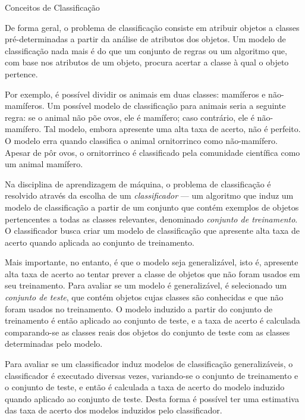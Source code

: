 \begin{section}{Conceitos de Classificação} \label{cap:clas1}
	
	De forma geral, o problema de classificação consiste em atribuir objetos a classes pré-determinadas a partir da análise de atributos dos objetos. Um modelo de classificação nada mais é do que um conjunto de regras ou um algoritmo que, com base nos atributos de um objeto, procura acertar a classe à qual o objeto pertence. 

	Por exemplo, é possível dividir os animais em duas classes: mamíferos e não-mamíferos. Um possível modelo de classificação para animais seria a seguinte regra: se o animal não põe ovos, ele é mamífero; caso contrário, ele é não-mamífero. Tal modelo, embora apresente uma alta taxa de acerto, não é perfeito. O modelo erra quando classifica o animal ornitorrinco como não-mamífero. Apesar de pôr ovos, o ornitorrinco é classificado pela comunidade científica como um animal mamífero.
	
	
	
	Na disciplina de aprendizagem de máquina, o problema de classificação é resolvido através da escolha de um \emph{classificador} --- um algoritmo que induz um modelo de classificação a partir de um conjunto que contém exemplos de objetos pertencentes a todas as classes relevantes, denominado \emph{conjunto de treinamento}. O classificador busca criar um modelo de classificação que apresente alta taxa de acerto quando aplicada ao conjunto de treinamento. 
	
	Mais importante, no entanto, é que o modelo seja generalizável, isto é, apresente alta taxa de acerto ao tentar prever a classe de objetos que não foram usados em seu treinamento. Para avaliar se um modelo é generalizável, é selecionado um \emph{conjunto de teste}, que contém objetos cujas classes são conhecidas e que não foram usados no treinamento. O modelo induzido a partir do conjunto de treinamento é então aplicado ao conjunto de teste, e a taxa de acerto é calculada comparando-se as classes reais dos objetos do conjunto de teste com as classes determinadas pelo modelo.
	
	Para avaliar se um classificador induz modelos de classificação generalizáveis, o classificador é executado diversas vezes, variando-se o conjunto de treinamento e o conjunto de teste, e então é calculada a taxa de acerto do modelo induzido quando aplicado ao conjunto de teste. Desta forma é possível ter uma estimativa das taxa de acerto dos modelos induzidos pelo classificador.
	
\end{section}	
	
